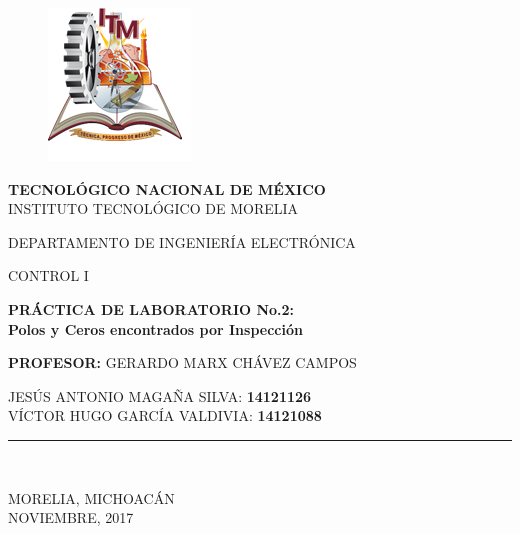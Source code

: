 \documentclass[letterpaper,10pt]{article}
\begin{document}
	
\begin{titlepage}
	
	\begin{center}
		\vspace*{-1in}
		\begin{figure}[htb]
			\centering
			\includegraphics[scale=1.5]{ESCUDO}
		\end{figure}
		
		\textbf{TECNOLÓGICO NACIONAL DE MÉXICO}\\
		\vspace*{0.15in}
		INSTITUTO TECNOLÓGICO DE MORELIA \\
		\vspace*{0.3in}
		\begin{large}
			DEPARTAMENTO DE INGENIERÍA ELECTRÓNICA\\
		\end{large}
		\vspace*{0.2in}
		\begin{large}
			CONTROL I\\
		\end{large}
		\vspace*{0.3in}
		\begin{Large}
			\textbf{PRÁCTICA DE LABORATORIO No.2: \\
			Polos y Ceros encontrados por Inspección}\\ 
		\end{Large}
		\vspace*{0.3in}
		\begin{large}
		\textbf{PROFESOR:} GERARDO MARX CHÁVEZ CAMPOS\\
		\end{large}
		\vspace*{0.2in}
		\begin{large}
			JESÚS ANTONIO MAGAÑA SILVA: \textbf{14121126}\\
			VÍCTOR HUGO GARCÍA VALDIVIA: \textbf{14121088}
		\end{large}
		\vspace*{0.3in}
		\rule{80mm}{0.1mm}\\
		\vspace*{0.1in}
		\begin{large}
			MORELIA, MICHOACÁN \\
			NOVIEMBRE, 2017 \\
		\end{large}
	\end{center}
\end{titlepage}
\end{document}
